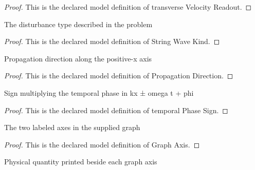 \begin{proof}
  This is the declared model definition of transverse Velocity Readout.
\end{proof}
\begin{definition}
  \label{def:physics:phyx-mini-0290:phyxminiproblems-problemphyxmini0290-stringwavekind}
  The disturbance type described in the problem
\end{definition}
\begin{proof}
  This is the declared model definition of String Wave Kind.
\end{proof}
\begin{definition}
  \label{def:physics:phyx-mini-0290:phyxminiproblems-problemphyxmini0290-propagationdirection}
  Propagation direction along the positive-x axis
\end{definition}
\begin{proof}
  This is the declared model definition of Propagation Direction.
\end{proof}
\begin{definition}
  \label{def:physics:phyx-mini-0290:phyxminiproblems-problemphyxmini0290-temporalphasesign}
  Sign multiplying the temporal phase in kx ± omega t + phi
\end{definition}
\begin{proof}
  This is the declared model definition of temporal Phase Sign.
\end{proof}
\begin{definition}
  \label{def:physics:phyx-mini-0290:phyxminiproblems-problemphyxmini0290-graphaxis}
  The two labeled axes in the supplied graph
\end{definition}
\begin{proof}
  This is the declared model definition of Graph Axis.
\end{proof}
\begin{definition}
  \label{def:physics:phyx-mini-0290:phyxminiproblems-problemphyxmini0290-axisquantity}
  Physical quantity printed beside each graph axis
\end{definition}
